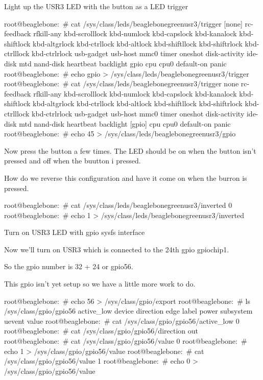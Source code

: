 \begin{Lab}
\begin{exe} {Light up the USR3 LED with the button as a LED trigger}
   \begin{sol}
      \begin{raw}
root@beaglebone:~# cat /sys/class/leds/beaglebone\:green\:usr3/trigger 
[none] rc-feedback rfkill-any kbd-scrolllock kbd-numlock kbd-capslock
kbd-kanalock kbd-shiftlock kbd-altgrlock kbd-ctrllock kbd-altlock
kbd-shiftllock kbd-shiftrlock kbd-ctrlllock kbd-ctrlrlock usb-gadget
usb-host mmc0 timer oneshot disk-activity ide-disk mtd nand-disk
heartbeat backlight gpio cpu cpu0 default-on panic 
root@beaglebone:~# echo gpio > /sys/class/leds/beaglebone\:green\:usr3/trigger
root@beaglebone:~# cat /sys/class/leds/beaglebone\:green\:usr3/trigger 
none rc-feedback rfkill-any kbd-scrolllock kbd-numlock kbd-capslock
kbd-kanalock kbd-shiftlock kbd-altgrlock kbd-ctrllock kbd-altlock
kbd-shiftllock kbd-shiftrlock kbd-ctrlllock kbd-ctrlrlock usb-gadget
usb-host mmc0 timer oneshot disk-activity ide-disk mtd nand-disk
heartbeat backlight [gpio] cpu cpu0 default-on panic 
root@beaglebone:~# echo 45 > /sys/class/leds/beaglebone\:green\:usr3/gpio
      \end{raw}

   Now press the button a few times. The LED should be on when the button
isn't pressed and off when the buutton i pressed.

   How do we reverse this configuration and have it come on when the burron
is pressed.
      \begin{raw}
root@beaglebone:~# cat /sys/class/leds/beaglebone\:green\:usr3/inverted 
0
root@beaglebone:~# echo 1 > /sys/class/leds/beaglebone\:green\:usr3/inverted 
      \end{raw}

   \end{sol}
\end{exe}

\begin{exe} {Turn on USR3 LED with gpio sysfs interface}

   Now we'll turn on USR3 which is connected to the 24th gpio gpiochip1.

   So the gpio number is 32 + 24 or gpio56.

   This gpio isn't yet setup so we have a little more work to do.

   \begin{sol}
      \begin{raw}
root@beaglebone:~# echo 56 > /sys/class/gpio/export 
root@beaglebone:~# ls /sys/class/gpio/gpio56
active_low  device  direction  edge  label  power  subsystem  uevent  value
root@beaglebone:~# cat /sys/class/gpio/gpio56/active_low 
0
root@beaglebone:~# cat /sys/class/gpio/gpio56/direction 
out
root@beaglebone:~# cat /sys/class/gpio/gpio56/value 
0
root@beaglebone:~# echo 1 > /sys/class/gpio/gpio56/value 
root@beaglebone:~# cat /sys/class/gpio/gpio56/value 
1
root@beaglebone:~# echo 0 > /sys/class/gpio/gpio56/value 
      \end{raw}
   \end{sol}
\end{exe}


\end{Lab}
